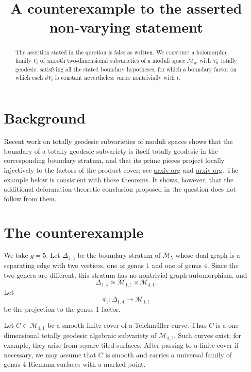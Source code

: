 \documentclass[11pt]{article}
\title{A counterexample to the asserted non-varying statement}
\date{}
\theoremstyle{remark}
\newcommand{\Mbar}{\overline{\mathcal M}}
\newcommand{\M}{\mathcal M}
\newcommand{\p}{\partial}
\begin{document}
\maketitle

\begin{abstract}
The assertion stated in the question is false as written. We construct a holomorphic family \(V_t\) of smooth two-dimensional subvarieties of a moduli space \(\M_g\), with \(V_0\) totally geodesic, satisfying all the stated boundary hypotheses, for which a boundary factor on which each \(\p V_t\) is constant nevertheless varies nontrivially with \(t\).
\end{abstract}

\section{Background}

Recent work on totally geodesic subvarieties of moduli spaces shows that the boundary of a totally geodesic subvariety is itself totally geodesic in the corresponding boundary stratum, and that its prime pieces project locally injectively to the factors of the product cover; see \href{https://arxiv.org/html/2412.06765v1}{arxiv.org} and \href{https://arxiv.org/html/2412.16330v2}{arxiv.org}. The example below is consistent with those theorems. It shows, however, that the additional deformation-theoretic conclusion proposed in the question does not follow from them.

\section{The counterexample}

We take \(g=5\). Let \(\Delta_{1,4}\) be the boundary stratum of \(\Mbar_5\) whose dual graph is a separating edge with two vertices, one of genus \(1\) and one of genus \(4\). Since the two genera are different, this stratum has no nontrivial graph automorphism, and
\[
\Delta_{1,4}\simeq \M_{1,1}\times \M_{4,1}.
\]
Let
\[
\pi_1:\Delta_{1,4}\longrightarrow \M_{1,1}
\]
be the projection to the genus \(1\) factor.

Let \(C\subset \M_{4,1}\) be a smooth finite cover of a Teichm\"uller curve. Thus \(C\) is a one-dimensional totally geodesic algebraic subvariety of \(\M_{4,1}\). Such curves exist; for example, they arise from square-tiled surfaces. After passing to a finite cover if necessary, we may assume that \(C\) is smooth and carries a universal family of genus \(4\) Riemann surfaces with a marked point.
\end{document}
